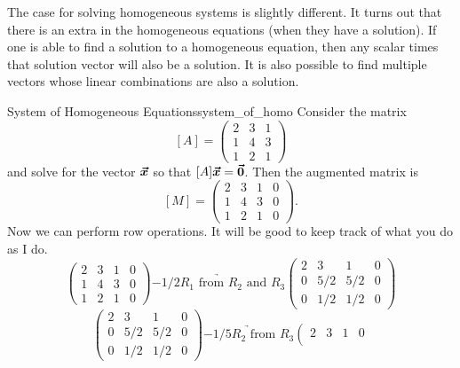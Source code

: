         The case for solving homogeneous systems is slightly different. It turns out that there is an extra  in the homogeneous equations (when they have a solution).  If one is able to find a solution to a homogeneous equation, then any scalar times that solution vector will also be a solution.  It is also possible to find multiple vectors whose linear combinations are also a solution.
        
        \begin{ex}{System of Homogeneous Equations}{system_of_homo}
        Consider the matrix
        \[
        [A]=\begin{pmatrix}
        2 & 3 & 1\\
        1 & 4 & 3\\
        1 & 2 & 1
        \end{pmatrix}
        \]
        and solve for the vector $\boldsymbol{\vec{x}}$ so that $[A]\boldsymbol{\vec{x}}=\boldsymbol{\vec{0}}$. Then the augmented matrix is
        \[
        [M]=\left(\begin{array}{ccc|c}
        2 & 3 & 1  &  0 \\
        1 & 4 & 3 & 0\\
        1 & 2 & 1 & 0
        \end{array}\right).
        \]
        Now we can perform row operations.  It will be good to keep track of what you do as I do.
        \[
        \left(\begin{array}{ccc|c}
        2 & 3 & 1  &  0 \\
        1 & 4 & 3 & 0\\
        1 & 2 & 1 & 0
        \end{array}\right) \underrightarrow{-1/2 R_1 \textrm{ from } R_2 \textrm{ and } R_3} 
        \left(\begin{array}{ccc|c}
        2 & 3 & 1  &  0 \\
        0 & 5/2 & 5/2 & 0\\
        0 & 1/2 & 1/2 & 0
        \end{array}\right)
        \]
        \[
        \left(\begin{array}{ccc|c}
        2 & 3 & 1  &  0 \\
        0 & 5/2 & 5/2 & 0\\
        0 & 1/2 & 1/2 & 0
        \end{array}\right) \underrightarrow{-1/5 R_2 \textrm{ from } R_3} 
        \left(\begin{array}{ccc|c}
        2 & 3 & 1  &  0 \\

\end{array}\]
\end{ex}
